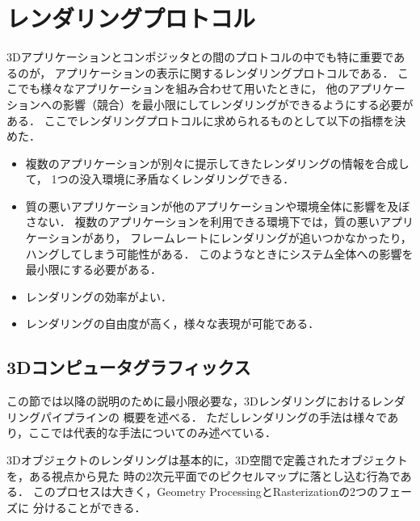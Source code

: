 \chapter{レンダリングプロトコル}

3Dアプリケーションとコンポジッタとの間のプロトコルの中でも特に重要であるのが，
アプリケーションの表示に関するレンダリングプロトコルである．
ここでも様々なアプリケーションを組み合わせて用いたときに，
他のアプリケーションへの影響（競合）を最小限にしてレンダリングができるようにする必要がある．
ここでレンダリングプロトコルに求められるものとして以下の指標を決めた．

\begin{itemize}
  \item 複数のアプリケーションが別々に提示してきたレンダリングの情報を合成して，
        1つの没入環境に矛盾なくレンダリングできる．
  \item 質の悪いアプリケーションが他のアプリケーションや環境全体に影響を及ぼさない．
        複数のアプリケーションを利用できる環境下では，質の悪いアプリケーションがあり，
        フレームレートにレンダリングが追いつかなかったり，ハングしてしまう可能性がある．
        このようなときにシステム全体への影響を最小限にする必要がある．
  \item レンダリングの効率がよい．
  \item レンダリングの自由度が高く，様々な表現が可能である．
\end{itemize}

\section{3Dコンピュータグラフィックス}
\label{section:3DCG}

この節では以降の説明のために最小限必要な，3Dレンダリングにおけるレンダリングパイプラインの
概要を述べる．
ただしレンダリングの手法は様々であり，ここでは代表的な手法についてのみ述べている．

3Dオブジェクトのレンダリングは基本的に，3D空間で定義されたオブジェクトを，ある視点から見た
時の2次元平面でのピクセルマップに落とし込む行為である．
このプロセスは大きく，Geometry ProcessingとRasterizationの2つのフェーズに
分けることができる．

